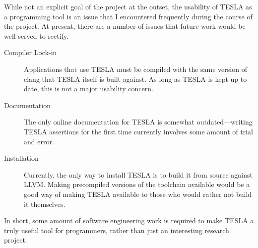 While not an explicit goal of the project at the outset, the usability of TESLA
as a programming tool is an issue that I encountered frequently during the
course of the project. At present, there are a number of issues that future work
would be well-served to rectify.
\begin{description}
  \item[Compiler Lock-in] Applications that use TESLA must be compiled with the
    same version of clang that TESLA itself is built against. As long as TESLA
    is kept up to date, this is not a major usability concern.
  
  \item[Documentation] The only online documentation for TESLA is somewhat
  outdated---writing TESLA assertions for the first time currently involves some
  amount of trial and error.

  \item[Installation] Currently, the only way to install TESLA is to build it
  from source against LLVM. Making precompiled versions of the toolchain
  available would be a good way of making TESLA available to those who would
  rather not build it themselves.
\end{description}

In short, some amount of software engineering work is required to make TESLA a
truly useful tool for programmers, rather than just an interesting research
project.
